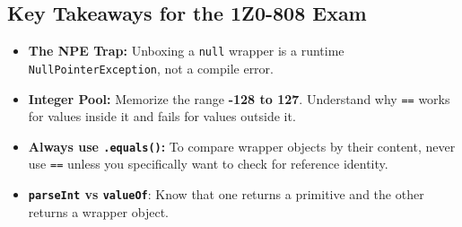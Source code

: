 \documentclass[12pt]{article}
\begin{document}
\begin{enumerate}[label=(\arabic*)]
\section*{Key Takeaways for the 1Z0-808 Exam}
\begin{itemize}
\item \textbf{The NPE Trap:} Unboxing a \texttt{null} wrapper is a runtime \texttt{NullPointerException}, not a compile error.
\item \textbf{Integer Pool:} Memorize the range \textbf{-128 to 127}. Understand why \texttt{==} works for values inside it and fails for values outside it.
\item \textbf{Always use \texttt{.equals()}:} To compare wrapper objects by their content, never use \texttt{==} unless you specifically want to check for reference identity.
\item \textbf{\texttt{parseInt} vs \texttt{valueOf}}: Know that one returns a primitive and the other returns a wrapper object.
\end{itemize}
\end{enumerate}
\end{document}
